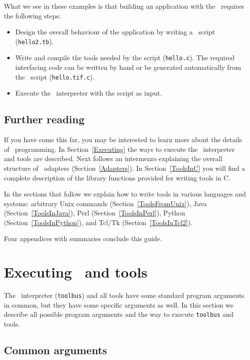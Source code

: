 \documentclass[a4,twoside,noweb]{article} %
\begin{document}
What we see in these examples is that
building an application with the \TB\ requires the following steps:
\begin{itemize}
\item Design the overall behaviour of the application by writing a \T\ script ({\tt hello2.tb}).
\item Write and compile the tools needed by the script ({\tt hello.c}).
The required interfacing code can be written by hand or be generated
automatically from the \T\ script ({\tt hello.tif.c}).
\item Execute the \TB\ interpreter with the script as input.
\end{itemize}

\subsection{Further reading}
If you have come this far, you may be interested to learn more about the details
of \TB\ programming.
In Section~\ref{Executing} the ways to execute the \TB\ interpreter
and tools are described.
Next follows an intermezzo explaining the overall structure of \TB\ adapters
(Section~\ref{Adapters}).
In Section~\ref{ToolsInC} you will find a complete description
of the library functions provided for writing tools in C.

In the sections that follow we explain how to write tools in various languages
and systems:
arbitrary Unix commands (Section~\ref{ToolsFromUnix}),
Java (Section~\ref{ToolsInJava}),
Perl (Section~\ref{ToolsInPerl}),
Python (Section~\ref{ToolsInPython}), and
Tcl/Tk (Section~\ref{ToolsInTcl2}).

Four appendices with summaries conclude this guide.

\section{\label{Executing}Executing \TB\ and tools}

The \TB\ interpreter ({\tt toolbus}) and all tools have some
standard program arguments in common, but they have some specific
arguments as well. In this section we describe all possible program arguments
and the way to execute {\tt toolbus} and tools.

\subsection{Common arguments}
\end{document}
